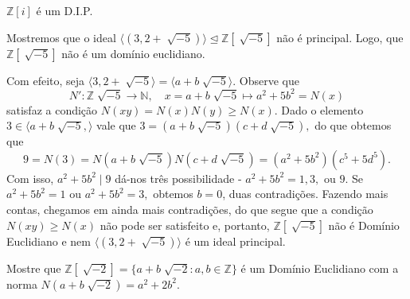 \documentclass[AlgebraII/algebraII_notes.tex]{subfiles}
\begin{document}
\begin{crl*}
	\(\mathbb{Z}[i]\) é um D.I.P.
\end{crl*}
\begin{example}
	Mostremos que o ideal \(\langle (3, 2 + \sqrt[]{-5}) \rangle \trianglelefteq{\mathbb{Z}[\sqrt[]{-5}]}\) não é principal. Logo, que
	\(\mathbb{Z}[\sqrt[]{-5}]\) não é um domínio euclidiano.

	Com efeito, seja \(\langle 3, 2 + \sqrt[]{-5} \rangle = \langle a + b\sqrt[]{-5} \rangle.\) Observe que
	\[
		N':\mathbb{Z}\sqrt[]{-5}\rightarrow \mathbb{N},\quad x = a+b\sqrt[]{-5}\mapsto a^{2}+5b^{2} = N(x)
	\]
	satisfaz a condição \(N(xy) = N(x)N(y)\geq N(x).\) Dado o elemento \(3\in \langle a + b\sqrt[]{-5}, \rangle\)
	vale que \(3 = (a+b\sqrt[]{-5})(c+d\sqrt[]{-5}),\) do que obtemos que
	\[
		9 = N(3) = N(a+b\sqrt[]{-5})N(c+d\sqrt[]{-5}) = (a^{2}+5b^{2})(c^{5}+5d^{5}).
	\]
	Com isso, \(a^{2}+5b^{2}\mid 9\) dá-nos três possibilidade - \(a^{2} + 5b^{2} = 1, 3,\text{ ou }9.\)
	Se \(a^{2} + 5b^{2} = 1\) ou \(a^{2} + 5b^{2} = 3,\) obtemos \(b = 0\), duas contradições. Fazendo mais contas,
	chegamos em ainda mais contradições, do que segue que a condição \(N(xy)\geq N(x)\) não pode ser satisfeito e, portanto,
	\(\mathbb{Z}[\sqrt[]{-5}]\) não é Domínio Euclidiano e nem \(\langle (3, 2+\sqrt[]{-5}) \rangle\) é um ideal principal.
\end{example}
\begin{example}[Exercício]
	Mostre que \(\mathbb{Z}[\sqrt[]{-2}] = \{a + b\sqrt[]{-2}: a, b\in \mathbb{Z}\}\) é um Domínio
	Euclidiano com a norma \(N(a+b\sqrt[]{-2}) = a^{2} + 2b^{2}.\)
\end{example}
\end{document}
